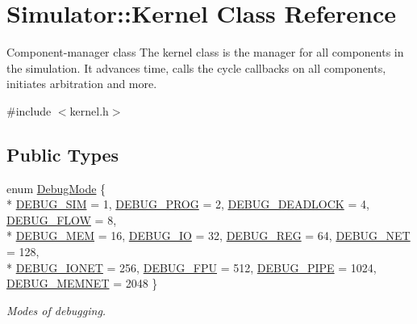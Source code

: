 \hypertarget{class_simulator_1_1_kernel}{\section{Simulator\+:\+:Kernel Class Reference}
\label{class_simulator_1_1_kernel}
}


Component-\/manager class The kernel class is the manager for all components in the simulation. It advances time, calls the cycle callbacks on all components, initiates arbitration and more.  




{\ttfamily \#include $<$kernel.\+h$>$}

\subsection*{Public Types}
\begin{DoxyCompactItemize}
\item 
enum \hyperlink{class_simulator_1_1_kernel_a69dec9d2b2d106e64de63f97301e234a}{Debug\+Mode} \{ \\*
\hyperlink{class_simulator_1_1_kernel_a69dec9d2b2d106e64de63f97301e234aac1d621d783166a33be29e7cdb6ec0637}{D\+E\+B\+U\+G\+\_\+\+S\+I\+M} = 1, 
\hyperlink{class_simulator_1_1_kernel_a69dec9d2b2d106e64de63f97301e234aa4c7b8054a67a2eb6bc2f975026669cf3}{D\+E\+B\+U\+G\+\_\+\+P\+R\+O\+G} = 2, 
\hyperlink{class_simulator_1_1_kernel_a69dec9d2b2d106e64de63f97301e234aaa0bf9e3b8b0cf429c5a04992ab60074f}{D\+E\+B\+U\+G\+\_\+\+D\+E\+A\+D\+L\+O\+C\+K} = 4, 
\hyperlink{class_simulator_1_1_kernel_a69dec9d2b2d106e64de63f97301e234aa69c8d584aaea26b48c2649c5b1c00607}{D\+E\+B\+U\+G\+\_\+\+F\+L\+O\+W} = 8, 
\\*
\hyperlink{class_simulator_1_1_kernel_a69dec9d2b2d106e64de63f97301e234aafa59308d321333d469f3a49503f7844a}{D\+E\+B\+U\+G\+\_\+\+M\+E\+M} = 16, 
\hyperlink{class_simulator_1_1_kernel_a69dec9d2b2d106e64de63f97301e234aaae377b10e15f336b5ba5f5876542e54f}{D\+E\+B\+U\+G\+\_\+\+I\+O} = 32, 
\hyperlink{class_simulator_1_1_kernel_a69dec9d2b2d106e64de63f97301e234aadaa52a1a219d6e0f590dfdfb2d3b1352}{D\+E\+B\+U\+G\+\_\+\+R\+E\+G} = 64, 
\hyperlink{class_simulator_1_1_kernel_a69dec9d2b2d106e64de63f97301e234aa82b8dbf789f0a0fa27c808b6121d6974}{D\+E\+B\+U\+G\+\_\+\+N\+E\+T} = 128, 
\\*
\hyperlink{class_simulator_1_1_kernel_a69dec9d2b2d106e64de63f97301e234aa88868a4cbb6b8ff3b97e597c111d1d22}{D\+E\+B\+U\+G\+\_\+\+I\+O\+N\+E\+T} = 256, 
\hyperlink{class_simulator_1_1_kernel_a69dec9d2b2d106e64de63f97301e234aabd2f29b2e44719b6d1b002a675b03d60}{D\+E\+B\+U\+G\+\_\+\+F\+P\+U} = 512, 
\hyperlink{class_simulator_1_1_kernel_a69dec9d2b2d106e64de63f97301e234aafc8a8606c29b7735b78f985fe17c6048}{D\+E\+B\+U\+G\+\_\+\+P\+I\+P\+E} = 1024, 
\hyperlink{class_simulator_1_1_kernel_a69dec9d2b2d106e64de63f97301e234aa6dbde64d112dd31fd0d49e47ae02876b}{D\+E\+B\+U\+G\+\_\+\+M\+E\+M\+N\+E\+T} = 2048
 \}
\begin{DoxyCompactList}\small\item\em Modes of debugging. \end{DoxyCompactList}\end{DoxyCompactItemize}
